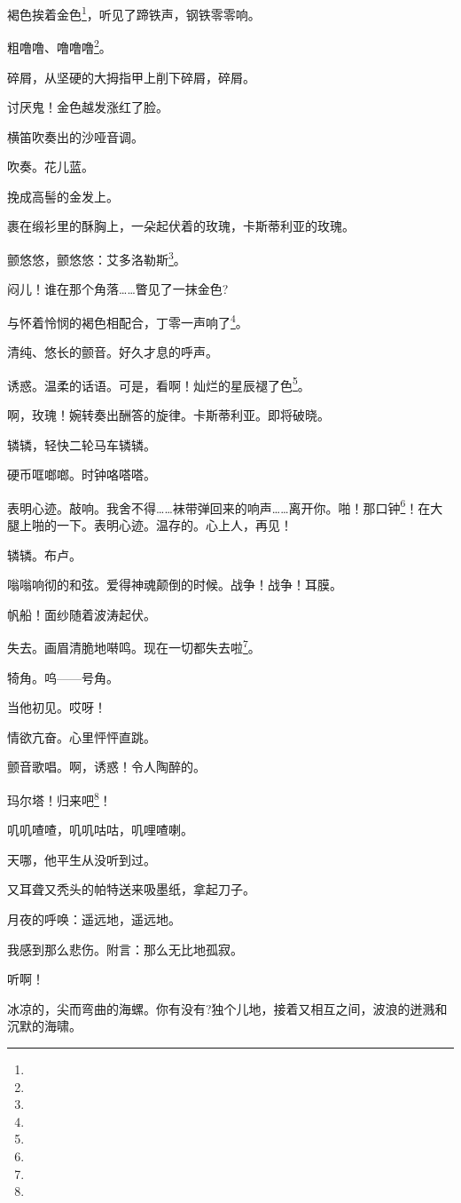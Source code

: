 \par 褐色挨着金色\footnote{}，听见了蹄铁声，钢铁零零响。
\par 粗噜噜、噜噜噜\footnote{}。
\par 碎屑，从坚硬的大拇指甲上削下碎屑，碎屑。
\par 讨厌鬼！金色越发涨红了脸。
\par 横笛吹奏出的沙哑音调。
\par 吹奏。花儿蓝。
\par 挽成高髻的金发上。
\par 裹在缎衫里的酥胸上，一朵起伏着的玫瑰，卡斯蒂利亚的玫瑰。
\par 颤悠悠，颤悠悠：艾多洛勒斯\footnote{}。
\par 闷儿！谁在那个角落……瞥见了一抹金色?
\par 与怀着怜悯的褐色相配合，丁零一声响了\footnote{}。
\par 清纯、悠长的颤音。好久才息的呼声。
\par 诱惑。温柔的话语。可是，看啊！灿烂的星辰褪了色\footnote{}。
\par 啊，玫瑰！婉转奏出酬答的旋律。卡斯蒂利亚。即将破晓。
\par 辚辚，轻快二轮马车辚辚。
\par 硬币哐啷啷。时钟咯嗒嗒。
\par 表明心迹。敲响。我舍不得……袜带弹回来的响声……离开你。啪！那口钟\footnote{}！在大腿上啪的一下。表明心迹。温存的。心上人，再见！
\par 辚辚。布卢。
\par 嗡嗡响彻的和弦。爱得神魂颠倒的时候。战争！战争！耳膜。
\par 帆船！面纱随着波涛起伏。
\par 失去。画眉清脆地啭鸣。现在一切都失去啦\footnote{}。
\par 犄角。呜——号角。
\par 当他初见。哎呀！
\par 情欲亢奋。心里怦怦直跳。
\par 颤音歌唱。啊，诱惑！令人陶醉的。
\par 玛尔塔！归来吧\footnote{}！
\par 叽叽喳喳，叽叽咕咕，叽哩喳喇。
\par 天哪，他平生从没听到过。
\par 又耳聋又秃头的帕特送来吸墨纸，拿起刀子。
\par 月夜的呼唤：遥远地，遥远地。
\par 我感到那么悲伤。附言：那么无比地孤寂。
\par 听啊！
\par 冰凉的，尖而弯曲的海螺。你有没有?独个儿地，接着又相互之间，波浪的迸溅和沉默的海啸。
